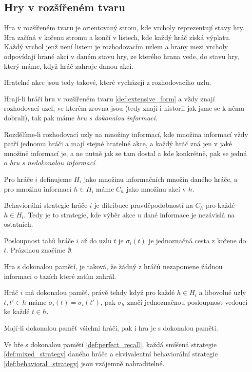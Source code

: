 \subsection{Hry v rozšířeném tvaru}

\begin{definition}\label{def:extensive_form}
Hra v rozšířeném tvaru je orientovaný strom, kde vrcholy reprezentují stavy hry. 
Hra začíná v kořenu stromu a končí v listech, kde každý hráč získá výplatu. 
Každý vrchol jenž není listem je rozhodovacím uzlem a hrany mezi vrcholy odpovídají hrané akci v daném stavu hry, ze kterého hrana vede, do stavu hry, který máme, když hráč zahraje danou akci. 

Hratelné akce jsou tedy takové, které vycházejí z rozhodovacího uzlu.
\end{definition}

\begin{definition}\label{def:perfect_info}
    Hrají-li hráči hru v rozšířeném tvaru \ref{def:extensive_form} a vždy znají rozhodovací uzel, ve kterém zrovna jsou (tedy znají i historii jak jsme se k němu dobrali), tak pak máme \textit{hru s dokonalou informací}. 
\end{definition}
\begin{definition}\label{def:imperfect_info}
    Rozdělíme-li rozhodovací uzly na množiny informací, kde množina informací vždy patří jednomu hráči a mají stejné hratelné akce, a každý hráč zná jen v jaké množině informací je, a ne nutně jak se tam dostal a kde konkrétně, pak se jedná o \textit{hru s nedokonalou informací}. 

    Pro hráče $i$ definujeme $H_i$ jako množinu informačních množin daného hráče, a pro množinu informací $h \in H_i$ máme $C_h$ jako množinu akcí v $h$.
\end{definition}
\begin{definition}\label{def:behavioral_strategy}
Behaviorální strategie hráče $i$ je ditribuce pravděpodobností na $C_h$ pro každé $h \in H_i$. 
Tedy je to strategie, kde výběr akce u dané informace je nezávislá na ostatních. 
\end{definition}
\begin{definition}\label{def:sequence}
    Posloupnost tahů hráče $i$ až do uzlu $t$ je $\sigma_i(t)$ je jednoznačná cesta z kořene do $t$. 
    Prázdnou značíme $\emptyset$.
\end{definition}
\begin{definition}\label{def:perfect_recall}
Hra s dokonalou pamětí, je taková, že žádný z hráčů nezapomene žádnou informaci o tazích které zatím zahrál. 

Hráč $i$ má dokonalou paměť, právě tehdy když pro každé $h \in H_i$ a libovolné uzly $t,t' \in h$ máme $\sigma_i(t) = \sigma_i(t')$, pak $\sigma_h$ značí jednoznačnou posloupnost vedoucí ke každé $t \in h$. 

Mají-li dokonalou paměť všichni hráči, pak i hra je s dokonalou pamětí. 
\end{definition}

\begin{theorem}\label{thm:khun}
    Ve hře s dokonalou pamětí \ref{def:perfect_recall}, každá smíšená strategie \ref{def:mixed_strategy} daného hráče a ekvivalentní behaviorální strategie \ref{def:behavioral_strategy} jsou vzájemně nahraditelné. 
\end{theorem}
